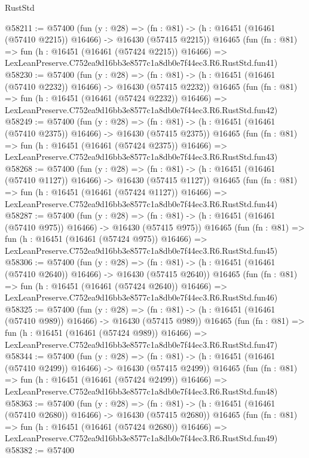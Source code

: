\begin{lexlean}{RustStd}
\begin{coremodule}
@58211 := @57400
    (fun (y : @28) =>
    (fn : @81) -> (h : @16451 (@16461 (@57410 @2215)) @16466) -> @16430 (@57415 @2215))
    @16465
    (fun (fn : @81) =>
    fun (h : @16451 (@16461 (@57424 @2215)) @16466) =>
    LexLeanPreserve.C752ea9d16bb3e8577c1a8db0e7f44ec3.R6.RustStd.fun41)
@58230 := @57400
    (fun (y : @28) =>
    (fn : @81) -> (h : @16451 (@16461 (@57410 @2232)) @16466) -> @16430 (@57415 @2232))
    @16465
    (fun (fn : @81) =>
    fun (h : @16451 (@16461 (@57424 @2232)) @16466) =>
    LexLeanPreserve.C752ea9d16bb3e8577c1a8db0e7f44ec3.R6.RustStd.fun42)
@58249 := @57400
    (fun (y : @28) =>
    (fn : @81) -> (h : @16451 (@16461 (@57410 @2375)) @16466) -> @16430 (@57415 @2375))
    @16465
    (fun (fn : @81) =>
    fun (h : @16451 (@16461 (@57424 @2375)) @16466) =>
    LexLeanPreserve.C752ea9d16bb3e8577c1a8db0e7f44ec3.R6.RustStd.fun43)
@58268 := @57400
    (fun (y : @28) =>
    (fn : @81) -> (h : @16451 (@16461 (@57410 @1127)) @16466) -> @16430 (@57415 @1127))
    @16465
    (fun (fn : @81) =>
    fun (h : @16451 (@16461 (@57424 @1127)) @16466) =>
    LexLeanPreserve.C752ea9d16bb3e8577c1a8db0e7f44ec3.R6.RustStd.fun44)
@58287 := @57400
    (fun (y : @28) =>
    (fn : @81) -> (h : @16451 (@16461 (@57410 @975)) @16466) -> @16430 (@57415 @975))
    @16465
    (fun (fn : @81) =>
    fun (h : @16451 (@16461 (@57424 @975)) @16466) =>
    LexLeanPreserve.C752ea9d16bb3e8577c1a8db0e7f44ec3.R6.RustStd.fun45)
@58306 := @57400
    (fun (y : @28) =>
    (fn : @81) -> (h : @16451 (@16461 (@57410 @2640)) @16466) -> @16430 (@57415 @2640))
    @16465
    (fun (fn : @81) =>
    fun (h : @16451 (@16461 (@57424 @2640)) @16466) =>
    LexLeanPreserve.C752ea9d16bb3e8577c1a8db0e7f44ec3.R6.RustStd.fun46)
@58325 := @57400
    (fun (y : @28) =>
    (fn : @81) -> (h : @16451 (@16461 (@57410 @989)) @16466) -> @16430 (@57415 @989))
    @16465
    (fun (fn : @81) =>
    fun (h : @16451 (@16461 (@57424 @989)) @16466) =>
    LexLeanPreserve.C752ea9d16bb3e8577c1a8db0e7f44ec3.R6.RustStd.fun47)
@58344 := @57400
    (fun (y : @28) =>
    (fn : @81) -> (h : @16451 (@16461 (@57410 @2499)) @16466) -> @16430 (@57415 @2499))
    @16465
    (fun (fn : @81) =>
    fun (h : @16451 (@16461 (@57424 @2499)) @16466) =>
    LexLeanPreserve.C752ea9d16bb3e8577c1a8db0e7f44ec3.R6.RustStd.fun48)
@58363 := @57400
    (fun (y : @28) =>
    (fn : @81) -> (h : @16451 (@16461 (@57410 @2680)) @16466) -> @16430 (@57415 @2680))
    @16465
    (fun (fn : @81) =>
    fun (h : @16451 (@16461 (@57424 @2680)) @16466) =>
    LexLeanPreserve.C752ea9d16bb3e8577c1a8db0e7f44ec3.R6.RustStd.fun49)
@58382 := @57400

\end{coremodule}
\end{lexlean}
